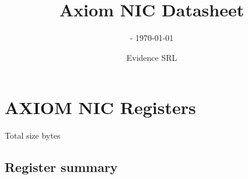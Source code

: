\documentclass[10pt,a4paper]{paper}
\title{Axiom NIC Datasheet}
\subtitle{\versionapi - \today}
\author{Evidence SRL}
\begin{document}
\maketitle


\section{AXIOM NIC Registers}
\begin{regdescription}
	Total size       bytes\\
\end{regdescription}

\subsection{Register summary}
\end{document}
